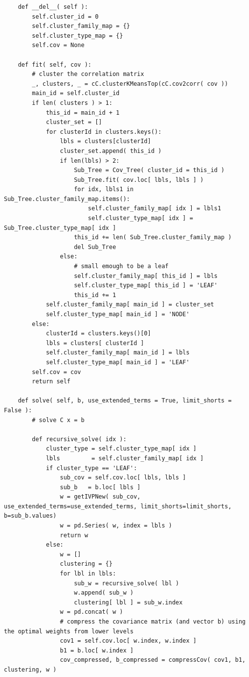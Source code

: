 \documentclass[10pt,twoside,titlepage]{article}   %
\begin{document}
\begin{lstlisting}
    def __del__( self ):
        self.cluster_id = 0
        self.cluster_family_map = {}
        self.cluster_type_map = {}
        self.cov = None

    def fit( self, cov ):
        # cluster the correlation matrix
        _, clusters, _ = cC.clusterKMeansTop(cC.cov2corr( cov ))
        main_id = self.cluster_id
        if len( clusters ) > 1:
            this_id = main_id + 1
            cluster_set = []
            for clusterId in clusters.keys():
                lbls = clusters[clusterId]
                cluster_set.append( this_id )
                if len(lbls) > 2:
                    Sub_Tree = Cov_Tree( cluster_id = this_id )
                    Sub_Tree.fit( cov.loc[ lbls, lbls ] )
                    for idx, lbls1 in Sub_Tree.cluster_family_map.items():
                        self.cluster_family_map[ idx ] = lbls1
                        self.cluster_type_map[ idx ] = Sub_Tree.cluster_type_map[ idx ]
                    this_id += len( Sub_Tree.cluster_family_map )
                    del Sub_Tree
                else:
                    # small emough to be a leaf
                    self.cluster_family_map[ this_id ] = lbls
                    self.cluster_type_map[ this_id ] = 'LEAF'
                    this_id += 1
            self.cluster_family_map[ main_id ] = cluster_set
            self.cluster_type_map[ main_id ] = 'NODE'
        else:
            clusterId = clusters.keys()[0]
            lbls = clusters[ clusterId ]
            self.cluster_family_map[ main_id ] = lbls
            self.cluster_type_map[ main_id ] = 'LEAF'
        self.cov = cov
        return self

    def solve( self, b, use_extended_terms = True, limit_shorts = False ):
        # solve C x = b

        def recursive_solve( idx ):
            cluster_type = self.cluster_type_map[ idx ]
            lbls         = self.cluster_family_map[ idx ]
            if cluster_type == 'LEAF':
                sub_cov = self.cov.loc[ lbls, lbls ]
                sub_b   = b.loc[ lbls ]
                w = getIVPNew( sub_cov, use_extended_terms=use_extended_terms, limit_shorts=limit_shorts, b=sub_b.values)
                w = pd.Series( w, index = lbls )
                return w
            else:
                w = []
                clustering = {}
                for lbl in lbls:
                    sub_w = recursive_solve( lbl )
                    w.append( sub_w )
                    clustering[ lbl ] = sub_w.index
                w = pd.concat( w )
                # compress the covariance matrix (and vector b) using the optimal weights from lower levels
                cov1 = self.cov.loc[ w.index, w.index ]
                b1 = b.loc[ w.index ]
                cov_compressed, b_compressed = compressCov( cov1, b1, clustering, w )


\end{lstlisting}
\end{document}
